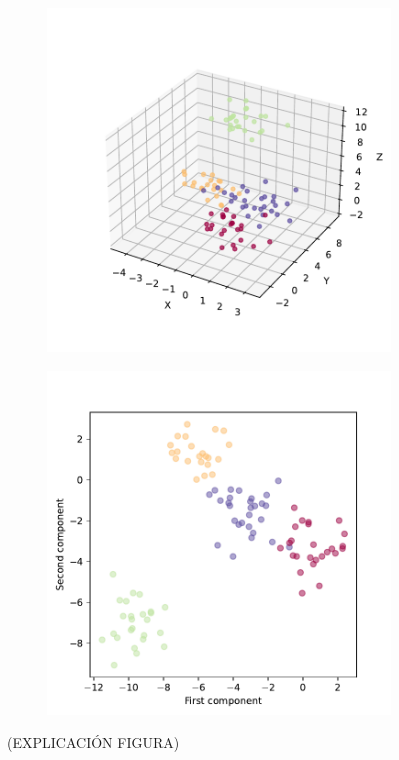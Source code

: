 \begin{figure}[h]
  \centering
  \begin{subfigure}{0.45\textwidth}
    \centering
    \includegraphics[width=\textwidth]{figures/affinity-3d.pdf}
    \caption{}
    \label{fig:}
  \end{subfigure}
  \begin{subfigure}{0.45\textwidth}
    \centering
    \includegraphics[width=\textwidth]{figures/affinity-pca.pdf}
    \caption{}
    \label{fig:}
  \end{subfigure}
  \caption[Prueba del algoritmo de propagación de afinidad.]{(EXPLICACIÓN FIGURA)}
  \label{fig:}
\end{figure}


